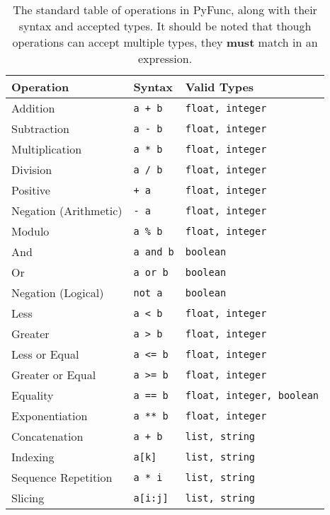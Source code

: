 \documentclass{l4proj}
\begin{document}
\begin{table}[h!]
    \caption{The standard table of operations in PyFunc, along with their syntax and accepted types. It should be noted that though operations can accept multiple types, they \textbf{must} match in an expression.}\label{tab:operators}
    \begin{center}
    \begin{tabular}{@{}|l|l|l|@{}}
    \hline
    \textbf{Operation}    & \textbf{Syntax}       &   \textbf{Valid Types}    \\ %
    \hline
    Addition              & \texttt{a + b}        &   \texttt{float, integer} \\
    Subtraction           & \texttt{a - b}        &   \texttt{float, integer} \\
    Multiplication        & \texttt{a * b}        &   \texttt{float, integer} \\
    Division              & \texttt{a / b}        &   \texttt{float, integer} \\
    Positive              & \texttt{+ a}          &   \texttt{float, integer} \\
    Negation (Arithmetic) & \texttt{- a}          &   \texttt{float, integer} \\
    Modulo                & \texttt{a \% b}       &   \texttt{float, integer} \\
    And                   & \texttt{a and b}      &   \texttt{boolean}        \\
    Or                    & \texttt{a or b}       &   \texttt{boolean}        \\
    Negation (Logical)    & \texttt{not a}        &   \texttt{boolean}        \\
    Less                  & \texttt{a < b}        &   \texttt{float, integer} \\
    Greater               & \texttt{a > b}        &   \texttt{float, integer} \\
    Less or Equal         & \texttt{a <= b}       &   \texttt{float, integer} \\
    Greater or Equal      & \texttt{a >= b}       &   \texttt{float, integer} \\
    Equality              & \texttt{a == b}       &   \texttt{float, integer, boolean} \\
    Exponentiation        & \texttt{a ** b}       &   \texttt{float, integer} \\
    Concatenation         & \texttt{a + b}        &   \texttt{list, string}   \\
    Indexing              & \texttt{a{[}k{]}}     &   \texttt{list, string}   \\
    Sequence Repetition   & \texttt{a * i}        &   \texttt{list, string}   \\
    Slicing               & \texttt{a{[}i:j{]}}   &   \texttt{list, string}   \\
    \hline
    \end{tabular}
    \end{center}
\end{table}
\end{document}
